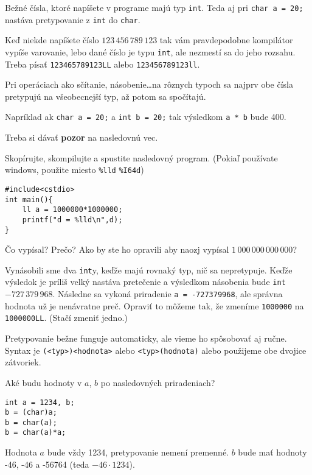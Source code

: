 \medskip

Bežné čísla, ktoré napíšete v programe majú typ \verb!int!.  Teda aj pri
\verb!char a = 20;! nastáva pretypovanie z \verb!int! do \verb!char!.

Keď niekde napíšete číslo $123\,456\,789\,123$ tak vám pravdepodobne kompilátor
vypíše varovanie, lebo dané číslo je typu \verb!int!, ale nezmestí sa do jeho
rozsahu. Treba písať \verb!123465789123LL! alebo \verb!123456789123ll!.

\medskip

Pri operáciach ako sčítanie, násobenie\dots na rôznych typoch sa najprv obe
čísla pretypujú na všeobecnejší typ, až potom sa spočítajú.

Napríklad ak \verb!char a = 20;! a \verb!int b = 20;! tak výsledkom \verb!a * b!
bude 400.

Treba si dávať \textbf{pozor} na nasledovnú vec.

 Skopírujte, skompilujte a spustite nasledovný program.  (Pokiaľ
používate windows, použite miesto \verb!%lld! \verb!%I64d!)
\begin{lstlisting}
#include<cstdio>
int main(){
    ll a = 1000000*1000000;    
    printf("d = %lld\n",d);
}
\end{lstlisting}
Čo vypísal? Prečo? Ako by ste ho opravili aby naozj vypísal
$1\,000\,000\,000\,000$?

 Vynásobili sme dva \verb!int!y, keďže majú rovnaký typ, nič sa
nepretypuje.  Keďže výsledok je príliš velký nastáva pretečenie a výsledkom
násobenia bude \verb!int!  $-727\,379\,968$. Následne sa vykoná priradenie
\verb!a = -727379968!, ale správna hodnota už je nenávratne preč. Opraviť to
môžeme tak, že zmeníme \verb!1000000! na \verb!1000000LL!. (Stačí zmeniť
jedno.)

\medskip

Pretypovanie bežne funguje automaticky, ale vieme ho spôsobovať aj ručne.
Syntax je \verb!(<typ>)<hodnota>! alebo \verb!<typ>(hodnota)! alebo použijeme
obe dvojice zátvoriek.

 Aké budu hodnoty v $a$, $b$ po nasledovných priradeniach? 
\begin{lstlisting}
int a = 1234, b;
b = (char)a;
b = char(a);
b = char(a)*a;
\end{lstlisting}

 Hodnota $a$ bude vždy 1234, pretypovanie nemení premenné. 
$b$ bude mať hodnoty -46, -46 a -56764 (teda $-46\cdot 1234$).

\medskip

